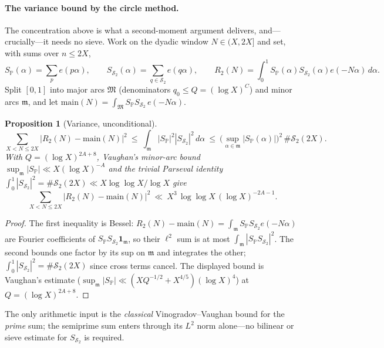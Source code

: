 \documentclass[]{interact}%
\newtheorem{proposition}{Proposition}
\newcommand{\PP}{\mathbb P}
\newcommand{\SSemi}{\mathcal S_2}
\begin{document}
\paragraph{The variance bound by the circle method.}
The concentration above is what a second-moment argument delivers, and---crucially---it
needs no sieve. Work on the dyadic window $N\in(X,2X]$ and set, with sums over
$n\le2X$,
\[
  S_\PP(\alpha)=\sum_{p}e(p\alpha),\qquad
  S_{\SSemi}(\alpha)=\sum_{q\in\SSemi}e(q\alpha),\qquad
  R_2(N)=\int_0^1 S_\PP(\alpha)S_{\SSemi}(\alpha)e(-N\alpha)\,d\alpha .
\]
Split $[0,1]$ into major arcs $\mathfrak M$ (denominators $q_0\le Q=(\log X)^{C}$) and
minor arcs $\mathfrak m$, and let $\mathrm{main}(N)=\int_{\mathfrak M}S_\PP S_{\SSemi}\,e(-N\alpha)$.

\begin{proposition}[Variance, unconditional]\label{prop:var}
\[
  \sum_{X<N\le2X}\big|R_2(N)-\mathrm{main}(N)\big|^2
  \ \le\ \int_{\mathfrak m}|S_\PP|^2|S_{\SSemi}|^2\,d\alpha
  \ \le\ \Big(\sup_{\alpha\in\mathfrak m}|S_\PP(\alpha)|\Big)^2\,\#\SSemi(2X).
\]
With $Q=(\log X)^{2A+8}$, Vaughan's minor-arc bound
$\sup_{\mathfrak m}|S_\PP|\ll X(\log X)^{-A}$ and the trivial Parseval identity
$\int_0^1|S_{\SSemi}|^2=\#\SSemi(2X)\ll X\log\log X/\log X$ give
\[
  \sum_{X<N\le2X}\big|R_2(N)-\mathrm{main}(N)\big|^2\ \ll\ X^{3}\,\log\log X\,(\log X)^{-2A-1}.
\]
\end{proposition}

\begin{proof}
The first inequality is Bessel: $R_2(N)-\mathrm{main}(N)=\int_{\mathfrak m}S_\PP S_{\SSemi}e(-N\alpha)$
are Fourier coefficients of $S_\PP S_{\SSemi}\mathbf 1_{\mathfrak m}$, so their $\ell^2$
sum is at most $\int_{\mathfrak m}|S_\PP S_{\SSemi}|^2$. The second bounds one factor by
its sup on $\mathfrak m$ and integrates the other; $\int_0^1|S_{\SSemi}|^2=\#\SSemi(2X)$
since cross terms cancel. The displayed bound is Vaughan's estimate
($\sup_{\mathfrak m}|S_\PP|\ll(X Q^{-1/2}+X^{4/5})(\log X)^4$) at $Q=(\log X)^{2A+8}$.
\end{proof}

The only arithmetic input is the \emph{classical} Vinogradov--Vaughan bound for the
\emph{prime} sum; the semiprime sum enters through its $L^2$ norm alone---no bilinear
or sieve estimate for $S_{\SSemi}$ is required.
\end{document}
